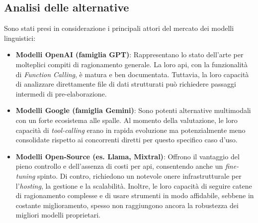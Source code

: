 \subsection{Analisi delle alternative}
Sono stati presi in considerazione i principali attori del mercato dei modelli linguistici:
\begin{itemize}
    \item \textbf{Modelli OpenAI (famiglia GPT)}: Rappresentano lo stato dell'arte per molteplici compiti di ragionamento generale. La loro \gls{api}, con la funzionalità di \textit{Function Calling}, è matura e ben documentata. Tuttavia, la loro capacità di analizzare direttamente file di dati strutturati può richiedere passaggi intermedi di pre-elaborazione.
    
    \item \textbf{Modelli Google (famiglia Gemini)}: Sono potenti alternative multimodali con un forte ecosistema alle spalle. Al momento della valutazione, le loro capacità di \textit{tool-calling} erano in rapida evoluzione ma potenzialmente meno consolidate rispetto ai concorrenti diretti per questo specifico caso d'uso.
    
    \item \textbf{Modelli Open-Source (es. Llama, Mixtral)}: Offrono il vantaggio del pieno controllo e dell'assenza di costi per \gls{api}, consentendo anche un \textit{fine-tuning} spinto. Di contro, richiedono un notevole onere infrastrutturale per l'\textit{hosting}, la gestione e la scalabilità. Inoltre, le loro capacità di seguire catene di ragionamento complesse e di usare strumenti in modo affidabile, sebbene in costante miglioramento, spesso non raggiungono ancora la robustezza dei migliori modelli proprietari.
\end{itemize}

